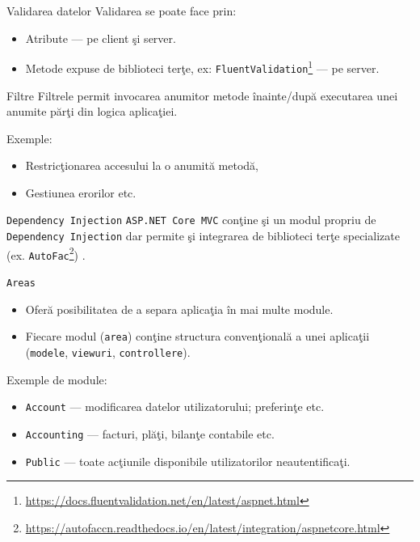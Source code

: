 \documentclass[presentation]{beamer}
\begin{document}
\begin{frame}[label={sec:org0db79e9},fragile]{Validarea datelor}
 Validarea se poate face prin:
\begin{itemize}
\item Atribute --- pe client şi server.
\item Metode expuse de biblioteci terţe, ex: \texttt{FluentValidation}\footnote{\url{https://docs.fluentvalidation.net/en/latest/aspnet.html}} --- pe server.
\end{itemize}
\end{frame}
\begin{frame}[label={sec:org8f4be7c}]{Filtre}
Filtrele permit invocarea anumitor metode înainte/după executarea unei anumite părţi din logica aplicaţiei.

Exemple:
\begin{itemize}
\item Restricţionarea accesului la o anumită metodă,
\item Gestiunea erorilor etc.
\end{itemize}
\end{frame}
\begin{frame}[label={sec:orgd1e5733},fragile]{\texttt{Dependency Injection}}
 \texttt{ASP.NET Core MVC} conţine şi un modul propriu de \texttt{Dependency Injection} dar permite şi integrarea de biblioteci terţe specializate (ex. \texttt{AutoFac}\footnote{\url{https://autofaccn.readthedocs.io/en/latest/integration/aspnetcore.html}}) .
\end{frame}
\begin{frame}[label={sec:org0e7a700},fragile]{\texttt{Areas}}
 \begin{itemize}
\item Oferă posibilitatea de a separa aplicaţia în mai multe module.
\item Fiecare modul (\texttt{area}) conţine structura convenţională a unei aplicaţii (\texttt{modele}, \texttt{viewuri}, \texttt{controllere}).
\end{itemize}

Exemple de module:
\begin{itemize}
\item \texttt{Account} --- modificarea datelor utilizatorului; preferinţe etc.
\item \texttt{Accounting} --- facturi, plăţi, bilanţe contabile etc.
\item \texttt{Public} --- toate acţiunile disponibile utilizatorilor neautentificaţi.
\end{itemize}
\end{frame}
\end{document}
